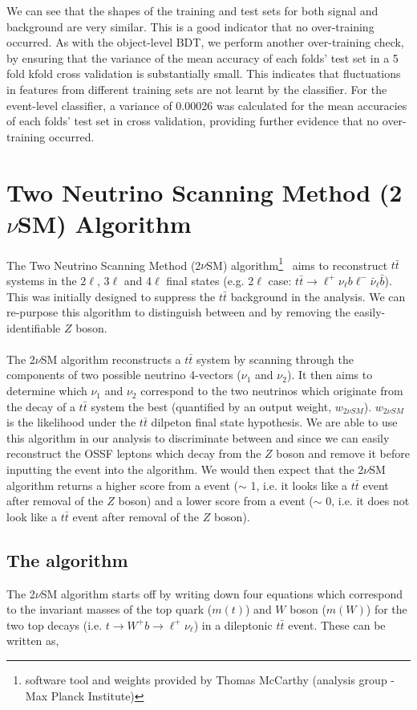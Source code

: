 We can see that the shapes of the training and test sets for both signal and background are very similar. This is a good indicator that no over-training occurred. As with the object-level BDT, we perform another over-training check, by ensuring that the variance of the mean accuracy of each folds' test set in a 5 fold kfold cross validation is substantially small. This indicates that fluctuations in features from different training sets are not learnt by the classifier. For the event-level classifier, a variance of 0.00026 was calculated for the mean accuracies of each folds' test set in cross validation, providing further evidence that no over-training occurred.


\section{Two Neutrino Scanning Method (2$\nu$SM) Algorithm}
\label{sec:2vsm}
The Two Neutrino Scanning Method (2$\nu$SM) algorithm\footnote{software tool and weights provided by Thomas McCarthy (\ttZ analysis group - Max Planck Institute)}~\cite{2vSM-ref1,2vSM-ref2} aims to reconstruct $t\bar{t}$ systems in the 2$\ell$, 3$\ell$ and 4$\ell$ final states (e.g. 2$\ell$ case: $t\bar{t}\rightarrow \ell^{+}\nu_{\ell}b\ell^{-}\bar{\nu}_{\ell}\bar{b}$). This was initially designed to suppress the $t\bar{t}$ background in the \ttZ analysis. We can re-purpose this algorithm to distinguish between \tWZ and \ttZ by removing the easily-identifiable $Z$ boson.\\\\
The 2$\nu$SM algorithm reconstructs a $t\bar{t}$ system by scanning through the components of two possible neutrino 4-vectors ($\nu_{1}$ and $\nu_{2}$). It then aims to determine which $\nu_{1}$ and $\nu_{2}$ correspond to the two neutrinos which originate from the decay of a $t\bar{t}$ system the best (quantified by an output weight, $w_{2\nu SM}$). $w_{2\nu SM}$ is the likelihood under the $t\bar{t}$ dilpeton final state hypothesis. We are able to use this algorithm in our analysis to discriminate between \tWZ and \ttZ since we can easily reconstruct the OSSF leptons which decay from the $Z$ boson and remove it before inputting the event into the algorithm. We would then expect that the 2$\nu$SM algorithm returns a higher score from a \ttZ event ($\sim$ 1, i.e. it looks like a $t\bar{t}$ event after removal of the $Z$ boson) and a lower score from a \tWZ event ($\sim$ 0, i.e. it does not look like a $t\bar{t}$ event after removal of the $Z$ boson).
\subsection{The algorithm}
The 2$\nu$SM algorithm starts off by writing down four equations which correspond to the invariant masses of the top quark ($m(t)$) and $W$ boson ($m(W)$) for the two top decays (i.e. $t\rightarrow W^{+}b \rightarrow \ell^{+} \nu_{\ell}$) in a dileptonic $t\bar{t}$ event. These can be written as,

